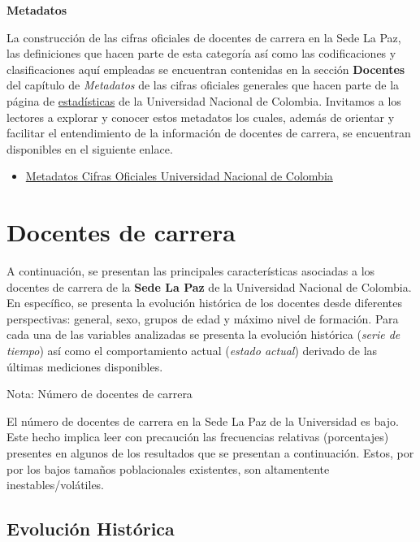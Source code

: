 \documentclass[
]{book}
\providecommand{\tightlist}{%
  \setlength{\itemsep}{0pt}\setlength{\parskip}{0pt}}
\begin{document}
\textbf{Metadatos}

La construcción de las cifras oficiales de docentes de carrera en la Sede La Paz, las definiciones que hacen parte de esta categoría así como las codificaciones y clasificaciones aquí empleadas se encuentran contenidas en la sección \textbf{Docentes} del capítulo de \emph{Metadatos} de las cifras oficiales generales que hacen parte de la página de \href{http://estadisticas.unal.edu.co/home/}{estadísticas} de la Universidad Nacional de Colombia. Invitamos a los lectores a explorar y conocer estos metadatos los cuales, además de orientar y facilitar el entendimiento de la información de docentes de carrera, se encuentran disponibles en el siguiente enlace.

\begin{itemize}
\tightlist
\item
  \href{http://estadisticas.unal.edu.co/menu-principal/cifras-generales/metadatos/cifras-generales/}{Metadatos Cifras Oficiales Universidad Nacional de Colombia}
\end{itemize}

\hypertarget{DocCar}{%
\section{Docentes de carrera}\label{DocCar}}

A continuación, se presentan las principales características asociadas a los docentes de carrera de la \textbf{Sede La Paz} de la Universidad Nacional de Colombia. En específico, se presenta la evolución histórica de los docentes desde diferentes perspectivas: general, sexo, grupos de edad y máximo nivel de formación. Para cada una de las variables analizadas se presenta la evolución histórica (\emph{serie de tiempo}) así como el comportamiento actual (\emph{estado actual}) derivado de las últimas mediciones disponibles.

Nota: Número de docentes de carrera

El número de docentes de carrera en la Sede La Paz de la Universidad es bajo. Este hecho implica leer con precaución las frecuencias relativas (porcentajes) presentes en algunos de los resultados que se presentan a continuación. Estos, por por los bajos tamaños poblacionales existentes, son altamentente inestables/volátiles.

\hypertarget{evoluciuxf3n-histuxf3rica-2}{%
\subsection{Evolución Histórica}\label{evoluciuxf3n-histuxf3rica-2}}
\end{document}
